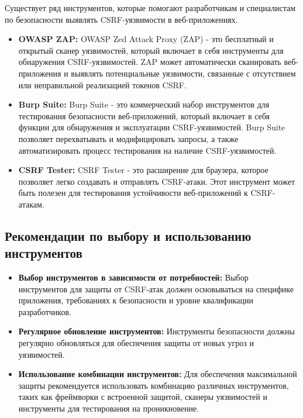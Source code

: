 \documentclass[a4paper,12pt]{diplom}
\begin{document}
	 Существует ряд инструментов, которые помогают разработчикам и специалистам по безопасности выявлять CSRF-уязвимости в веб-приложениях. 
	 
	 \begin{itemize}
	 	\item \textbf{OWASP ZAP:}  OWASP Zed Attack Proxy (ZAP) - это бесплатный и открытый сканер уязвимостей, который включает в себя инструменты для обнаружения CSRF-уязвимостей. ZAP может автоматически сканировать веб-приложения и выявлять потенциальные уязвимости, связанные с отсутствием или неправильной реализацией токенов CSRF. \cite{ZAP_tool}
	 	\item \textbf{Burp Suite:} Burp Suite - это коммерческий набор инструментов для тестирования безопасности веб-приложений, который включает в себя функции для обнаружения и эксплуатации CSRF-уязвимостей. Burp Suite позволяет перехватывать и модифицировать запросы, а также автоматизировать процесс тестирования на наличие CSRF-уязвимостей. \cite{Burp_Suite_tool}
	 	\item \textbf{CSRF Tester:} CSRF Tester - это расширение для браузера, которое позволяет легко создавать и отправлять CSRF-атаки. Этот инструмент может быть полезен для тестирования устойчивости веб-приложений к CSRF-атакам. \cite{CSRF_tool}
	 \end{itemize}
	 
	 \subsection{Рекомендации по выбору и использованию инструментов}
	 
	 \begin{itemize}
	 \item \textbf{Выбор инструментов в зависимости от потребностей:}  Выбор инструментов для защиты от CSRF-атак должен основываться на специфике приложения, требованиях к безопасности и уровне квалификации разработчиков.
	 \item \textbf{Регулярное обновление инструментов:}  Инструменты безопасности должны регулярно обновляться для обеспечения защиты от новых угроз и уязвимостей.
	 \item \textbf{Использование комбинации инструментов:}  Для обеспечения максимальной защиты рекомендуется использовать комбинацию различных инструментов, таких как фреймворки с встроенной защитой, сканеры уязвимостей и инструменты для тестирования на проникновение.
 	 \end{itemize}
	 
\end{document}
